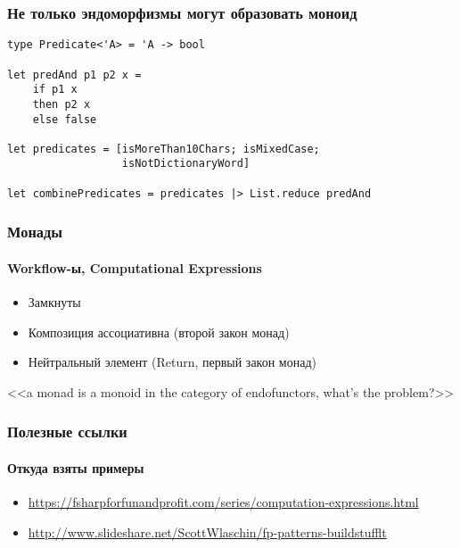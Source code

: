 \documentclass[xetex,mathserif,serif]{beamer}
\begin{document}
	\begin{frame}[fragile]
		\frametitle{Не только эндоморфизмы могут образовать моноид}
		\begin{verbatim}
type Predicate<'A> = 'A -> bool

let predAnd p1 p2 x = 
    if p1 x 
    then p2 x
    else false

let predicates = [isMoreThan10Chars; isMixedCase; 
                  isNotDictionaryWord]

let combinePredicates = predicates |> List.reduce predAnd
		\end{verbatim}
	\end{frame}

	\begin{frame}
		\frametitle{Монады}
		\framesubtitle{Workflow-ы, Computational Expressions}
		\begin{itemize}
			\item Замкнуты
			\item Композиция ассоциативна (второй закон монад)
			\item Нейтральный элемент (Return, первый закон монад)
		\end{itemize}
		<<a monad is a monoid in the category of endofunctors, what's the problem?>>
	\end{frame}

	\begin{frame}
		\frametitle{Полезные ссылки}
		\framesubtitle{Откуда взяты примеры}
		\begin{small}
			\begin{itemize}
				\item \url{https://fsharpforfunandprofit.com/series/computation-expressions.html}
				\item \url{http://www.slideshare.net/ScottWlaschin/fp-patterns-buildstufflt}
			\end{itemize}
		\end{small}
	\end{frame}
\end{document}
